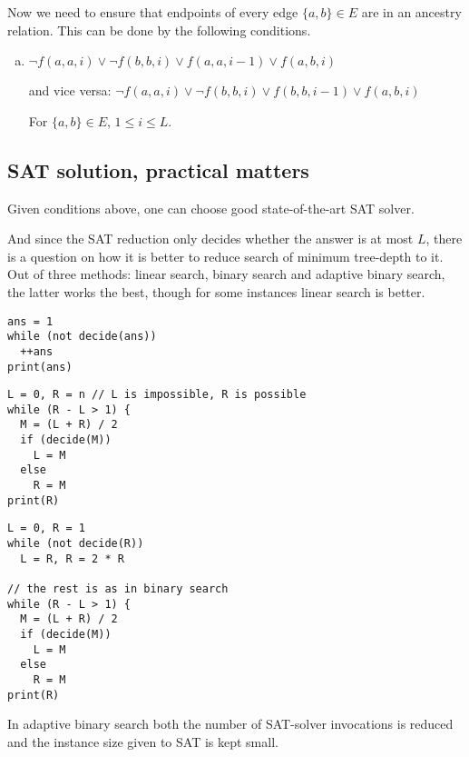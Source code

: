 \documentclass[a4paper,UKenglish,cleveref, autoref, thm-restate]{lipics-v2019}
\begin{document}
Now we need to ensure that endpoints of every edge $\{a, b\} \in E$ are in an ancestry relation.
This can be done by the following conditions.
\begin{enumerate}[(e)]
\item $\lnot f(a, a, i) \lor \lnot f(b, b, i) \lor f(a, a, i - 1) \lor f(a, b, i)$
	
	and vice versa: $\lnot f(a, a, i) \lor \lnot f(b, b, i) \lor f(b, b, i - 1) \lor f(a, b, i)$

    For $\{a, b\} \in E$, $1 \le i \le L$.
\end{enumerate}


\subsection{SAT solution, practical matters}

Given conditions above, one can choose good state-of-the-art SAT solver.

And since the SAT reduction only decides whether the answer is at most $L$, there is a question on how it is better
to reduce search of minimum tree-depth to it. Out of three methods: linear search, binary search and adaptive binary search,
the latter works the best, though for some instances linear search is better.

\begin{lstlisting}[caption={Linear Search},label=list:8-6,captionpos=t,abovecaptionskip=-\medskipamount]
ans = 1
while (not decide(ans))
  ++ans
print(ans)
\end{lstlisting}  

\begin{lstlisting}[caption={Binary Search},label=list:8-6,captionpos=t,abovecaptionskip=-\medskipamount]
L = 0, R = n // L is impossible, R is possible
while (R - L > 1) {
  M = (L + R) / 2
  if (decide(M))
    L = M
  else
    R = M
print(R)
\end{lstlisting}

\begin{lstlisting}[caption={Adaptive Binary Search},label=list:8-6,captionpos=t,abovecaptionskip=-\medskipamount]
L = 0, R = 1
while (not decide(R))
  L = R, R = 2 * R

// the rest is as in binary search
while (R - L > 1) {
  M = (L + R) / 2
  if (decide(M))
    L = M
  else
    R = M
print(R)
\end{lstlisting}  

In adaptive binary search both the number of SAT-solver invocations is reduced and the instance size given to SAT is kept small.



\end{document}
